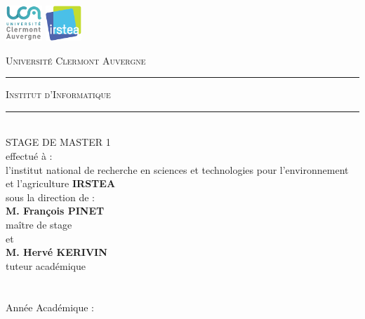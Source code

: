 \newenvironment{changemargin}[2]{\begin{list}{}{%
\setlength{\topsep}{0pt}%
\setlength{\leftmargin}{0pt}%
\setlength{\rightmargin}{0pt}%
\setlength{\listparindent}{\parindent}%
\setlength{\itemindent}{\parindent}%
\setlength{\parsep}{0pt plus 1pt}%
\addtolength{\leftmargin}{#1}%
\addtolength{\rightmargin}{#2}%
}\item }{\end{list}}
\begin{changemargin}{-2cm}{-2cm}
\newcommand{\HRule}{\rule[2mm]{10mm}{0.5mm}}
\thispagestyle{empty}
\includegraphics[height=50px]{images/Logo-UCA.png}
\hspace*{\fill}
\includegraphics[height=50px]{images/irstea_logo.png}
\begin{center}
    \textsc{\large Université Clermont Auvergne}\\[0.5mm]
    \HRule \textsc{ Institut d'Informatique} \HRule 
    \\[1cm]
    STAGE DE MASTER 1
    \\[1cm]
     effectué à : 
     \\
   l'institut national de recherche en sciences et technologies pour l'environnement et l'agriculture
   \textbf{IRSTEA}
   \\[0.5cm]
    sous la direction de : 
    \\[1cm]
    \textbf{M. François PINET}
    \\
    maître de stage
    \\[0.5cm]
    et
    \\[0.5cm]
  \textbf{M. Hervé KERIVIN}
    \\
    tuteur académique
    \\[2cm]
    
    {\huge \Title}
    \\[1cm]

    \textbf{\@author}
    \\[0.5cm]

    Année Académique : \@date
\end{center}
\end{changemargin}

